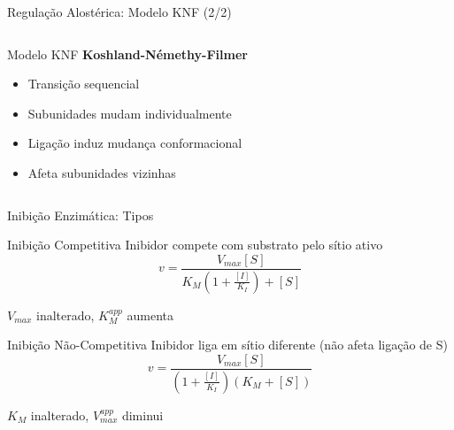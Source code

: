 \begin{frame}{Regulação Alostérica: Modelo KNF (2/2)}
\begin{columns}
\begin{block}{Modelo KNF}
\textbf{Koshland-Némethy-Filmer}
\begin{itemize}
    \item Transição sequencial
    \item Subunidades mudam individualmente
    \item Ligação induz mudança conformacional
    \item Afeta subunidades vizinhas
\end{itemize}
\end{block}

\begin{center}
\end{center}
\end{columns}
\end{frame}

\begin{frame}[shrink=10]{Inibição Enzimática: Tipos}
\begin{block}{Inibição Competitiva}
Inibidor compete com substrato pelo sítio ativo
\begin{equation*}
v = \frac{V_{max}[S]}{K_M\left(1 + \frac{[I]}{K_I}\right) + [S]}
\end{equation*}

$V_{max}$ inalterado, $K_M^{app}$ aumenta
\end{block}

\begin{block}{Inibição Não-Competitiva}
Inibidor liga em sítio diferente (não afeta ligação de S)
\begin{equation*}
v = \frac{V_{max}[S]}{\left(1 + \frac{[I]}{K_I}\right)(K_M + [S])}
\end{equation*}

$K_M$ inalterado, $V_{max}^{app}$ diminui
\end{block}
\end{frame}

